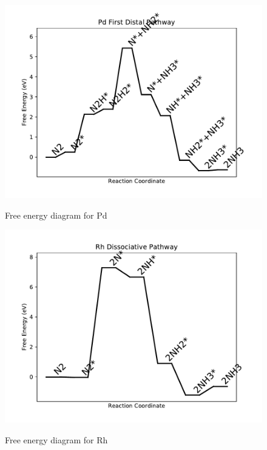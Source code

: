 \documentclass{article}
\begin{document}
\begin{figure}
\includegraphics[width=1\linewidth]{data/plots/Pd_distal_1.pdf}
\label{fig:Pd_distal_1}
\caption{Free energy diagram for Pd}
\end{figure}

\begin{figure}
\includegraphics[width=1\linewidth]{data/plots/Rh_dissociative.pdf}
\label{fig:Rh_dissociative}
\caption{Free energy diagram for Rh}
\end{figure}
\end{document}
